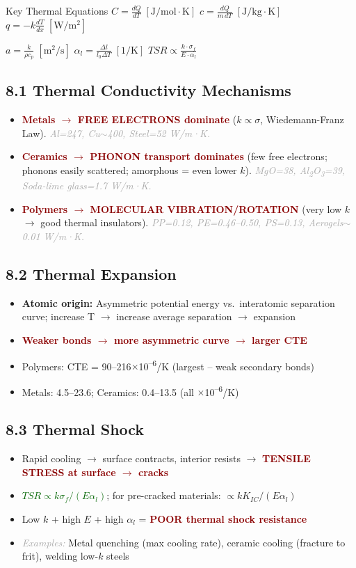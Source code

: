 \documentclass[11pt,a4paper]{article}
\newcommand{\mysubsec}[1]{\subsection*{#1}}
\newcommand{\CRIT}[1]{\textcolor{DarkRed}{\textbf{#1}}}
\newcommand{\FML}[1]{\textcolor{DarkGreen}{\textbf{#1}}}
\newcommand{\EXA}[1]{\textcolor{DarkGray}{\textit{#1}}}
\begin{document}
\begin{formbox}{Key Thermal Equations}
\Large\centering
$C = \frac{dQ}{dT}\;[\mathrm{J/mol\!\cdot\!K}]$ \hspace{0.5cm}
$c = \frac{dQ}{m\,dT}\;[\mathrm{J/kg\!\cdot\!K}]$ \hspace{0.5cm}
$q = -k\frac{dT}{dx}\;[\mathrm{W/m^2}]$

\vspace{4pt}
$a = \frac{k}{\rho c_p}\;[\mathrm{m^2/s}]$ \hspace{0.5cm}
$\alpha_l = \frac{\Delta l}{l_0\Delta T}\;[\mathrm{1/K}]$ \hspace{0.5cm}
$TSR \propto \frac{k\cdot\sigma_f}{E\cdot\alpha_l}$
\end{formbox}

\mysubsec{8.1 Thermal Conductivity Mechanisms}
\begin{itemize}[leftmargin=*,nosep]
    \item \CRIT{Metals $\to$ FREE ELECTRONS dominate} ($k \propto \sigma$, Wiedemann-Franz Law). \EXA{Al=247, Cu$\sim$400, Steel=52 W/m·K.}
    \item \CRIT{Ceramics $\to$ PHONON transport dominates} (few free electrons; phonons easily scattered; amorphous = even lower $k$). \EXA{MgO=38, Al\textsubscript{2}O\textsubscript{3}=39, Soda-lime glass=1.7 W/m·K.}
    \item \CRIT{Polymers $\to$ MOLECULAR VIBRATION/ROTATION} (very low $k$ $\to$ good thermal insulators). \EXA{PP=0.12, PE=0.46--0.50, PS=0.13, Aerogels$\sim$0.01 W/m·K.}
\end{itemize}

\mysubsec{8.2 Thermal Expansion}
\begin{itemize}[leftmargin=*,nosep]
    \item \textbf{Atomic origin:} Asymmetric potential energy vs.\ interatomic separation curve; increase T $\to$ increase average separation $\to$ expansion
    \item \CRIT{Weaker bonds $\to$ more asymmetric curve $\to$ larger CTE}
    \item Polymers: CTE = 90--216$\times$10\textsuperscript{--6}/K (largest -- weak secondary bonds)
    \item Metals: 4.5--23.6; Ceramics: 0.4--13.5 (all $\times$10\textsuperscript{--6}/K)
\end{itemize}

\mysubsec{8.3 Thermal Shock}
\begin{itemize}[leftmargin=*,nosep]
    \item Rapid cooling $\to$ surface contracts, interior resists $\to$ \CRIT{TENSILE STRESS at surface $\to$ cracks}
    \item \FML{$TSR \propto k\sigma_f/(E\alpha_l)$}; for pre-cracked materials: $\propto k K_{IC}/(E\alpha_l)$
    \item Low $k$ + high $E$ + high $\alpha_l$ = \CRIT{POOR thermal shock resistance}
    \item \EXA{Examples:} Metal quenching (max cooling rate), ceramic cooling (fracture to frit), welding low-$k$ steels
\end{itemize}
\end{document}
